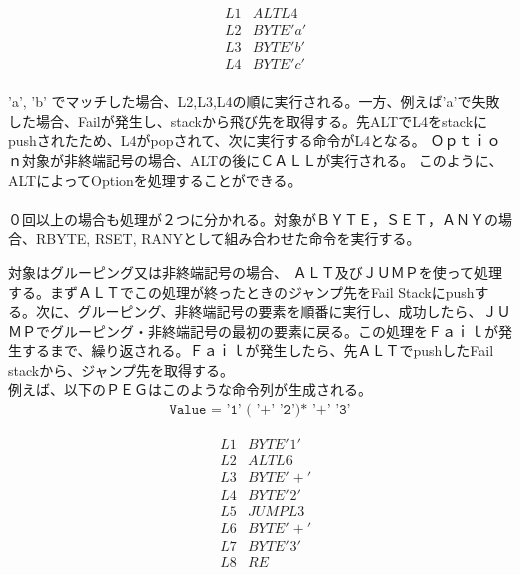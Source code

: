 \documentclass[12pt,oneside]{report}
\begin{document}
\begin{eqnarray}\nonumber
&L1& ALT L4\\\nonumber 
&L2& BYTE 'a'\\\nonumber
&L3& BYTE 'b'\\\nonumber
&L4 &BYTE 'c'\\\nonumber
\end{eqnarray}

'a', 'b' でマッチした場合、L2,L3,L4の順に実行される。一方、例えば'a'で失敗した場合、Failが発生し、stackから飛び先を取得する。先ALTでL4をstackにpushされたため、L4がpopされて、次に実行する命令がL4となる。
Ｏｐｔｉｏｎ対象が非終端記号の場合、ALTの後にＣＡＬＬが実行される。
このように、ALTによってOptionを処理することができる。\\
\\

０回以上の場合も処理が２つに分かれる。対象がＢＹＴＥ，ＳＥＴ，ＡＮＹの場合、RBYTE, RSET, RANYとして組み合わせた命令を実行する。


対象はグルーピング又は非終端記号の場合、
ＡＬＴ及びＪＵＭＰを使って処理する。まずＡＬＴでこの処理が終ったときのジャンプ先をFail Stackにpushする。次に、グルーピング、非終端記号の要素を順番に実行し、成功したら、ＪＵＭＰでグルーピング・非終端記号の最初の要素に戻る。この処理をＦａｉｌが発生するまで、繰り返される。Ｆａｉｌが発生したら、先ＡＬＴでpushしたFail stackから、ジャンプ先を取得する。\\





例えば、以下のＰＥＧはこのような命令列が生成される。
\begin{eqnarray}\nonumber
\texttt{Value = '1' ( '+' '2')*  '+' '3'}\nonumber
\end{eqnarray} \nonumber

\begin{eqnarray}\nonumber
&L1& BYTE '1'\\\nonumber
&L2& ALT L6\\\nonumber 
&L3& BYTE '+'\\\nonumber
&L4& BYTE '2'\\\nonumber
&L5& JUMP L3\\\nonumber
&L6& BYTE '+'\\\nonumber
&L7& BYTE '3'\\\nonumber
&L8& RE\\\nonumber
\end{eqnarray}
\end{document}
